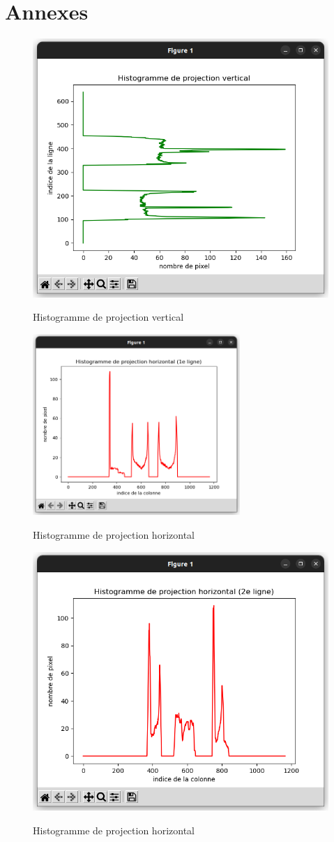 \documentclass[a4paper]{article}
\begin{document}
	\section*{Annexes}
		\begin{figure}[H]
			\caption{Histogramme de projection vertical}
			\includegraphics[width=.7\textwidth]{histoY.png}
			\centering
			\label{fig:histoY}
		\end{figure}
		\begin{figure}[H]
			\caption{Histogramme de projection horizontal}
			\includegraphics[width=0.7\textwidth]{histoX1.png}
			\centering
			\label{fig:histoX1}
		\end{figure}
		\begin{figure}[H]
			\caption{Histogramme de projection horizontal}
			\includegraphics[width=.7\textwidth]{histoX2.png}
			\centering
			\label{fig:histoX2}
		\end{figure}
\end{document}
